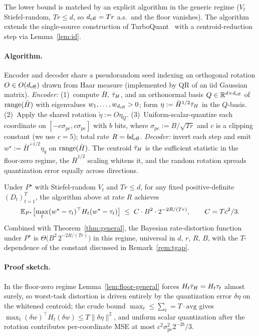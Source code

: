 The lower bound is matched by an explicit algorithm in the generic
regime ($V_t$ Stiefel-random, $Tr \leq d$, so $d_{\mathrm{eff}} = Tr$ a.s.\ and
the floor vanishes). The algorithm extends the single-source
construction of TurboQuant~\citep{zandieh2025turboquant} with a
centroid-reduction step via Lemma~\ref{lem:id}.

\paragraph{Algorithm.}\label{subsec:alg}\label{subsec:rd-encoder-impl}
Encoder and decoder share a pseudorandom seed indexing an orthogonal
rotation $O \in O(d_{\mathrm{eff}})$ drawn from Haar measure (implemented by QR of
an iid Gaussian matrix). \emph{Encoder:} (1)~compute $\bar H$, $\bar{\tau}_H$,
and an orthonormal basis $Q \in \mathbb{R}^{d\times d_{\mathrm{eff}}}$ of $\operatorname{range}(\bar H)$
with eigenvalues $w_1,\ldots,w_{d_{\mathrm{eff}}} > 0$; form $\eta := \bar
H^{1/2}\bar{\tau}_H$ in the $Q$-basis. (2)~Apply the shared rotation
$\tilde\eta := O\eta_Q$. (3)~Uniform-scalar-quantize each coordinate on
$[-c\sigma_{\mathrm{pc}}, c\sigma_{\mathrm{pc}}]$ with $b$ bits, where
$\sigma_{\mathrm{pc}} := B/\sqrt{Tr}$ and $c$ is a clipping constant
(we use $c = 5$); total rate $R = bd_{\mathrm{eff}}$. \emph{Decoder:} invert each
step and emit $w^\star := \bar H^{+1/2}\eta_q$ on $\operatorname{range}(\bar H)$. The
centroid $\bar{\tau}_H$ is the sufficient statistic in the floor-zero regime,
the $\bar H^{1/2}$ scaling whitens it, and the random rotation spreads
quantization error equally across directions.

\begin{theorem}\label{thm:achv}
Under $P^\star$ with Stiefel-random $V_t$ and $Tr\leq d$, for any fixed
positive-definite $(D_t)_{t=1}^T$, the algorithm above at rate $R$
achieves
\begin{equation}\label{eq:thm-ub}
  \mathbb{E}_{P^\star}\bigl[\max_t(w^\star-\tau_t)^\top H_t(w^\star-
  \tau_t)\bigr]
  \;\leq\; C\cdot B^2 \cdot 2^{-2R/(Tr)},
  \qquad C = Tc^2/3.
\end{equation}
Combined with Theorem~\ref{thm:general}, the Bayesian rate-distortion
function under $P^\star$ is $\Theta\bigl(B^2\, 2^{-2R/(Tr)}\bigr)$ in
this regime, universal in $d$, $r$, $R$, $B$, with the
$T$-dependence of the constant discussed in Remark~\ref{rem:tgap}.
\end{theorem}

\paragraph{Proof sketch.} In the floor-zero regime
Lemma~\ref{lem:floor-general} forces $H_t\bar{\tau}_H = H_t\tau_t$ almost
surely, so worst-task distortion is driven entirely by the quantization
error $\delta\eta$ on the whitened centroid; the crude bound
$\max_t \leq \sum_t = T\cdot\mathrm{avg}$ gives
$\max_t(\delta w)^\top H_t(\delta w) \leq T\|\delta\eta\|^2$, and
uniform scalar quantization after the rotation contributes
per-coordinate MSE at most $c^2\sigma_{\mathrm{pc}}^2 2^{-2b}/3$.

